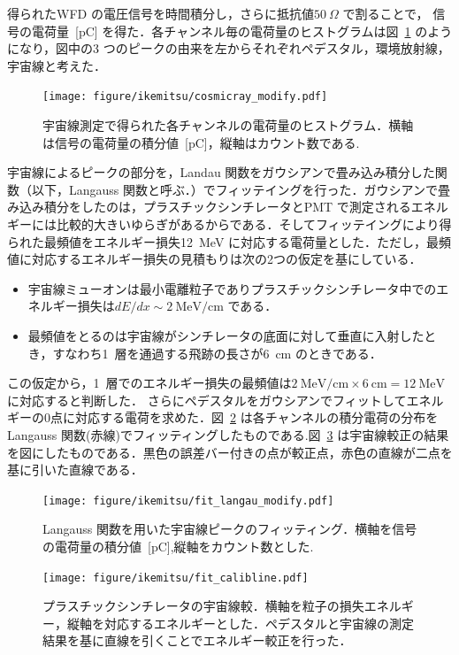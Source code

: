 得られたWFD の電圧信号を時間積分し，さらに抵抗値$50~\Omega$ で割ることで，
信号の電荷量~[pC] を得た．各チャンネル毎の電荷量のヒストグラムは図~\ref{cosmicray} のようになり，図中の3 つのピークの由来を左からそれぞれペデスタル，環境放射線，宇宙線と考えた．
\begin{figure}[H]
\centering
\texttt{[image: figure/ikemitsu/cosmicray\_modify.pdf]}
\caption{宇宙線測定で得られた各チャンネルの電荷量のヒストグラム．横軸は信号の電荷量の積分値~[pC]，縦軸はカウント数である. }
\label{cosmicray}
\end{figure}%

宇宙線によるピークの部分を，Landau 関数をガウシアンで畳み込み積分した関数（以下，Langauss 関数と呼ぶ．）でフィッテイングを行った．ガウシアンで畳み込み積分をしたのは，プラスチックシンチレータとPMT で測定されるエネルギーには比較的大きいゆらぎがあるからである．そしてフィッテイングにより得られた最頻値をエネルギー損失12~MeV に対応する電荷量とした．ただし，最頻値に対応するエネルギー損失の見積もりは次の2つの仮定を基にしている．
\begin{itemize}
\item 宇宙線ミューオンは最小電離粒子でありプラスチックシンチレータ中でのエネルギー損失は$dE/dx \sim 2~\mathrm{MeV/cm}$ である．
\item 最頻値をとるのは宇宙線がシンチレータの底面に対して垂直に入射したとき，すなわち1~層を通過する飛跡の長さが6~cm のときである．
\end{itemize}
この仮定から，1~層でのエネルギー損失の最頻値は$2~\mathrm{MeV/cm} \times 6~\mathrm{cm} = 12~\mathrm{MeV}$ に対応すると判断した\cite{leo}．
さらにペデスタルをガウシアンでフィットしてエネルギーの0点に対応する電荷を求めた．図~\ref{ps_langau} は各チャンネルの積分電荷の分布をLangauss 関数(赤線)でフィッティングしたものである.図~\ref{ps_cali} は宇宙線較正の結果を図にしたものである．黒色の誤差バー付きの点が較正点，赤色の直線が二点を基に引いた直線である．

\begin{figure}[H]
\centering
\texttt{[image: figure/ikemitsu/fit\_langau\_modify.pdf]}
\caption{Langauss 関数を用いた宇宙線ピークのフィッティング．横軸を信号の電荷量の積分値~[pC],縦軸をカウント数とした. }
\label{ps_langau}
\end{figure} 
\begin{figure}[H]
\centering
\texttt{[image: figure/ikemitsu/fit\_calibline.pdf]}
\caption{プラスチックシンチレータの宇宙線較．横軸を粒子の損失エネルギー，縦軸を対応するエネルギーとした．ペデスタルと宇宙線の測定結果を基に直線を引くことでエネルギー較正を行った．}\label{ps_cali}
\end{figure}

